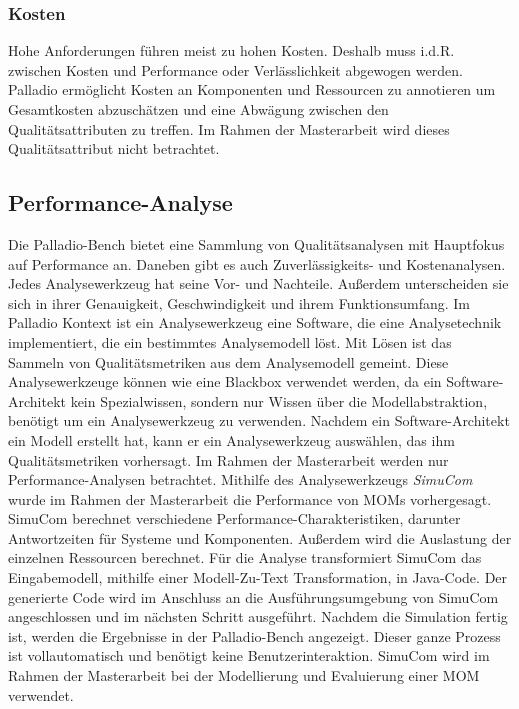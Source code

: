 \subsubsection{Kosten}
Hohe Anforderungen führen meist zu hohen Kosten. Deshalb muss i.d.R. zwischen Kosten und Performance oder Verlässlichkeit abgewogen werden. Palladio ermöglicht Kosten an Komponenten und Ressourcen zu annotieren um Gesamtkosten abzuschätzen und eine Abwägung zwischen den Qualitätsattributen zu treffen. Im Rahmen der Masterarbeit wird dieses Qualitätsattribut nicht betrachtet.


\subsection{Performance-Analyse}
Die Palladio-Bench bietet eine Sammlung von Qualitätsanalysen mit Hauptfokus auf Performance an. Daneben gibt es auch Zuverlässigkeits- und Kostenanalysen. Jedes Analysewerkzeug hat seine Vor- und Nachteile. Außerdem unterscheiden sie sich in ihrer Genauigkeit, Geschwindigkeit und ihrem Funktionsumfang. Im Palladio Kontext ist ein Analysewerkzeug eine Software, die eine Analysetechnik implementiert, die ein bestimmtes Analysemodell löst. Mit Lösen ist das Sammeln von Qualitätsmetriken aus dem Analysemodell gemeint. Diese Analysewerkzeuge können wie eine Blackbox verwendet werden, da ein Software-Architekt kein Spezialwissen, sondern nur Wissen über die Modellabstraktion, benötigt um ein Analysewerkzeug zu verwenden. Nachdem ein Software-Architekt ein Modell erstellt hat, kann er ein Analysewerkzeug auswählen, das ihm Qualitätsmetriken vorhersagt. Im Rahmen der Masterarbeit werden nur Performance-Analysen betrachtet.  Mithilfe des Analysewerkzeugs \emph{SimuCom} \cite{simucom} wurde im Rahmen der Masterarbeit die Performance von MOMs vorhergesagt. SimuCom berechnet verschiedene Performance-Charakteristiken, darunter Antwortzeiten für Systeme und Komponenten. Außerdem wird die Auslastung der einzelnen Ressourcen berechnet. Für die Analyse transformiert SimuCom das Eingabemodell, mithilfe einer Modell-Zu-Text Transformation, in Java-Code. Der generierte Code wird im Anschluss an die Ausführungsumgebung von SimuCom angeschlossen und im nächsten Schritt ausgeführt. Nachdem die Simulation fertig ist, werden die Ergebnisse in der Palladio-Bench angezeigt. Dieser ganze Prozess ist vollautomatisch und benötigt keine Benutzerinteraktion. SimuCom wird im Rahmen der Masterarbeit bei der Modellierung und Evaluierung einer MOM verwendet.

